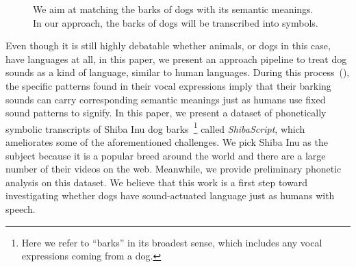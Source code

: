 \begin{figure}[h]
\centering
{}
\caption{We aim at matching the barks of dogs with its semantic meanings. In our approach, the barks of dogs will be transcribed into symbols. 
}
\label{fig:dog}
\end{figure}

Even though it is still highly debatable whether animals, or dogs in this
case, have languages at all, in this paper, we present an approach pipeline to treat dog sounds as a kind of language, similar to human languages. 
During this process~(), the specific patterns found in their vocal expressions imply that their barking sounds can carry corresponding semantic meanings just as humans use fixed sound patterns to signify.
In this paper, we present a dataset of phonetically symbolic transcripts of Shiba Inu dog barks~\footnote{Here we refer to ``barks'' in its broadest sense, which includes any vocal expressions coming from a dog.} called \textit{ShibaScript}, which ameliorates some of the aforementioned challenges. We pick Shiba Inu as the subject because it is a popular breed around the world and there are a large number of their videos on the web. Meanwhile, we provide preliminary phonetic analysis on this dataset. We believe that this work is a first step toward investigating whether dogs have sound-actuated language just as humans with speech.

